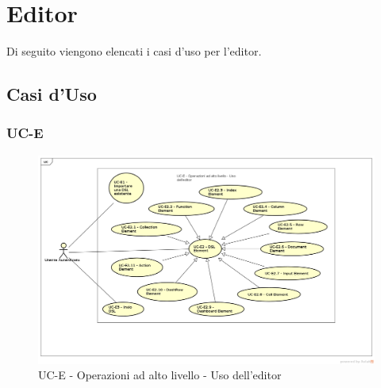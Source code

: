 \section{Editor}

Di seguito viengono elencati i casi d'uso per l'editor.


\subsection{Casi d'Uso}


\subsubsection{UC-E}

    \begin{figure}[H]
      \begin{center}
        \includegraphics[width=12cm]{res/img/UCEditor/UC-E}
      \caption{UC-E - Operazioni ad alto livello - Uso dell'editor}
      \end{center} 
    \end{figure}    
    
